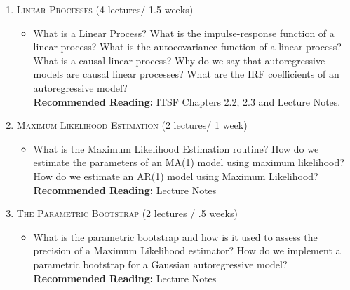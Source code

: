 \documentclass[12pt]{article} %
\numberwithin{equation}{section}
\theoremstyle{definition}
\newcommand{\0}{\textbf{0}}                          %
\begin{document}
\begin{enumerate}
\begin{itemize}
\end{itemize}
  
\item {\scshape{Linear Processes}} (4 lectures/ 1.5 weeks)

\begin{itemize}
\item What is a Linear Process? What is the impulse-response function of a linear process? What is the autocovariance function of a linear process? What is a causal linear process? Why do we say that autoregressive models are causal linear processes? What are the IRF coefficients of an autoregressive model? \\

\textbf{Recommended Reading:} ITSF Chapters 2.2, 2.3 and Lecture Notes.\\




\end{itemize}


\item {\scshape Maximum Likelihood Estimation} (2 lectures/ 1 week)

\begin{itemize}
\item What is the Maximum Likelihood Estimation routine? How do we estimate the parameters of an MA(1) model using maximum likelihood? How do we estimate an AR(1) model using Maximum Likelihood?   \\

\textbf{Recommended Reading:} Lecture Notes \\
\end{itemize}

\item {\scshape The Parametric Bootstrap} (2 lectures / .5 weeks)

\begin{itemize}
\item What is the parametric bootstrap and how is it used to assess the precision of a Maximum Likelihood estimator? How do we implement a parametric bootstrap for a Gaussian autoregressive model?   \\

\textbf{Recommended Reading:} Lecture Notes \\
\end{itemize}


\end{enumerate}
\end{document}
